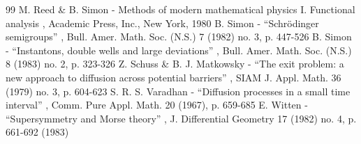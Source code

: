 \documentclass[10pt]{amsart}
\theoremstyle{definition}
\begin{document}
\begin{thebibliography}{99}
 M. Reed \& B. Simon - Methods of modern mathematical physics I. Functional analysis , Academic Press, Inc., New York, 1980
 B. Simon - “Schrödinger semigroups” , Bull. Amer. Math. Soc. (N.S.) 7 (1982) no. 3, p. 447-526
 B. Simon - “Instantons, double wells and large deviations” , Bull. Amer. Math. Soc. (N.S.) 8 (1983) no. 2, p. 323-326
 Z. Schuss \& B. J. Matkowsky - “The exit problem: a new approach to diffusion across potential barriers” , SIAM J. Appl. Math. 36 (1979) no. 3, p. 604-623
 S. R. S. Varadhan - “Diffusion processes in a small time interval” , Comm. Pure Appl. Math. 20 (1967), p. 659-685
 E. Witten - “Supersymmetry and Morse theory” , J. Differential Geometry 17 (1982) no. 4, p. 661-692 (1983)
\end{thebibliography}
\end{document}
